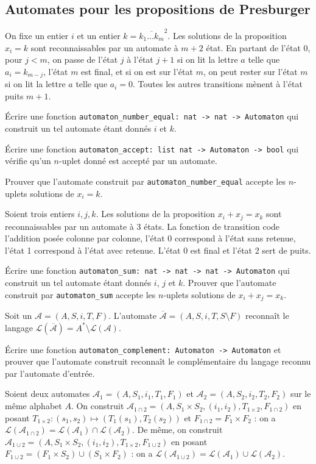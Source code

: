 \documentclass{article}
\begin{document}
\subsection{Automates pour les propositions de Presburger}

On fixe un entier \(i\) et un entier \(k = \overline{k_1 \dots k_m}^2\). Les solutions de la proposition \(x_i = k\) sont reconnaissables par un automate à \(m + 2\) état. En partant de l'état 0, pour \(j < m\), on passe de l'état \(j\) à l'état \(j + 1\) si on lit la lettre \(a\) telle que \(a_i = k_{m - j}\), l'état \(m\) est final, et si on est sur l'état \(m\), on peut rester sur l'état \(m\) si on lit la lettre \(a\) telle que \(a_i = 0\). Toutes les autres transitions mènent à l'état puits \(m + 1\).

Écrire une fonction \texttt{automaton_number_equal: nat -> nat -> Automaton} qui construit un tel automate étant donnés \(i\) et \(k\).

Écrire une fonction \texttt{automaton_accept: list nat -> Automaton -> bool} qui vérifie qu'un \(n\)-uplet donné est accepté par un automate.

Prouver que l'automate construit par \texttt{automaton_number_equal} accepte les \(n\)-uplets solutions de \(x_i = k\).

Soient trois entiers \(i, j, k\). Les solutions de la proposition \(x_i + x_j = x_k\) sont reconnaissables par un automate à 3 états. La fonction de transition code l'addition posée colonne par colonne, l'état 0 correspond à l'état sans retenue, l'état 1 correspond à l'état avec retenue. L'état 0 est final et l'état 2 sert de puits.

Écrire une fonction \texttt{automaton_sum: nat -> nat -> nat -> Automaton} qui construit un tel automate étant donnés \(i\), \(j\) et \(k\). Prouver que l'automate construit par \texttt{automaton_sum} accepte les \(n\)-uplets solutions de \(x_i + x_j = x_k\).

Soit un \(\mathcal A = (A, S, i, T, F)\). L'automate \(\overline{\mathcal A} = (A, S, i, T, S \setminus F)\) reconnaît le langage \(\mathcal L(\overline{\mathcal A}) = A^* \setminus \mathcal L(\mathcal A)\).

Écrire une fonction \texttt{automaton_complement: Automaton -> Automaton} et prouver que l'automate construit reconnaît le complémentaire du langage reconnu par l'automate d'entrée.

Soient deux automates \(\mathcal A_1 = (A, S_1, i_1, T_1, F_1)\) et \(\mathcal A_2 = (A, S_2, i_2, T_2, F_2)\) sur le même alphabet \(A\).
On construit \(\mathcal A_{1 \cap 2} = (A, S_1 \times S_2, (i_1, i_2), T_{1 \times 2}, F_{1 \cap 2})\) en posant \(T_{1 \times 2} : (s_1, s_2) \mapsto (T_1(s_1), T_2(s_2))\) et \(F_{1 \cap 2} = F_1 \times F_2\) : on a \(\mathcal L(\mathcal A_{1 \cap 2}) = \mathcal L(\mathcal A_1) \cap \mathcal L(\mathcal A_2)\).
De même, on construit \(\mathcal A_{1 \cup 2} = (A, S_1 \times S_2, (i_1, i_2), T_{1 \times 2}, F_{1 \cup 2})\)
en posant \(F_{1 \cup 2} = (F_1 \times S_2) \cup (S_1 \times F_2)\) :
on a \(\mathcal L(\mathcal A_{1 \cup 2}) = \mathcal L(\mathcal A_1) \cup \mathcal L(\mathcal A_2)\).
\end{document}
